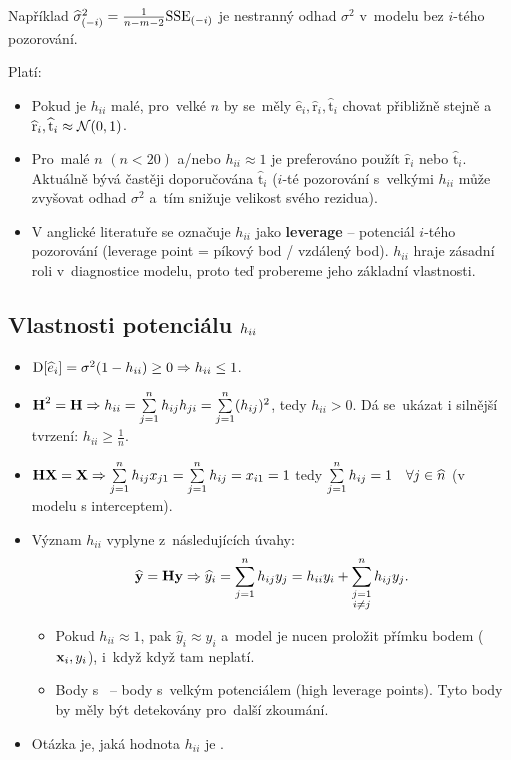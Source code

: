 Například $\widehat{\sigma}^2_{(-i)} = \frac{1}{n-m-2}\mathrm{SSE}_{(-i)}$ je nestranný odhad $\sigma^2$ v~modelu bez $i$-tého pozorování.

\begin{remark}
Platí:
\begin{itemize}
\item Pokud je $h_{ii}$ malé, pro~velké $n$ by se~měly $\widehat{\text{e}}_i, \widehat{\text{r}}_i, \widehat{\mathrm{t}}_i$ chovat přibližně stejně a~$\widehat{\text{r}}_i,\widehat{\mathrm{t}}_i \approx \mathcal{N} (0, 1)$.
\item Pro~malé $n$ $(n < 20)$ a/nebo $h_{ii} \approx 1$ je preferováno použít $\widehat{\text{r}}_i$ nebo $\widehat{\mathrm{t}}_i$. Aktuálně bývá častěji doporučována $\widehat{\mathrm{t}}_i$ ($i$-té pozorování s~velkými $h_{ii}$ může zvyšovat odhad $\sigma^2$ a~tím snižuje velikost svého rezidua).
\item V anglické literatuře se označuje $h_{ii}$ jako \textbf{leverage} -- potenciál $i$-tého pozorování (leverage point = píkový bod / vzdálený bod). $h_{ii}$ hraje zásadní roli v~diagnostice modelu, proto teď probereme jeho základní vlastnosti.
\end{itemize}
\end{remark}

\subsection{Vlastnosti potenciálu $h_{ii}$}

\begin{itemize}
\item $\mathrm{D} [\widehat{e}_i] = \sigma^2 (1 - h_{ii}) \geq 0 \Rightarrow h_{ii} \leq 1$.
\item $\textbf{H}^2 = \textbf{H} \Rightarrow h_{ii} = \sum\limits_{j=1}^{n} h_{ij} h_{ji} = \sum\limits_{j=1}^{n} (h_{ij})^2$, tedy $h_{ii} > 0$. Dá se~ukázat i silnější tvrzení: $h_{ii} \geq \frac{1}{n}$.
\item $\textbf{H}\mathbf{X} = \mathbf{X} \Rightarrow \sum\limits_{j=1}^{n} h_{ij} x_{j1} = \sum\limits_{j=1}^{n} h_{ij} = x_{i1} = 1$ tedy $\sum\limits_{j=1}^{n} h_{ij} = 1 \quad \forall j \in \widehat{n}$ (v modelu s interceptem).
\item Význam $h_{ii}$ vyplyne z~následujících úvahy:
 $$
 \widehat{\mathbf{y}} = \textbf{H} \mathbf{y} \Rightarrow \widehat{y}_i = \sum\limits_{j=1}^{n} h_{ij}y_j = h_{ii} y_i + \sum\limits_{\substack{j = 1 \\ i\neq j}}^n h_{ij} y_j.
 $$
 \begin{itemize}
 	\item Pokud $h_{ii} \approx 1$, pak $\widehat{y}_i \approx y_i$ a~model je nucen proložit přímku bodem ($\mathbf{x}_i, y_i$), i~když když tam neplatí.
 	\item Body s~ -- body s~velkým potenciálem (high leverage points). Tyto body by měly být detekovány pro~další zkoumání.
 \end{itemize}

 \item Otázka je, jaká hodnota $h_{ii}$ je .
\end{itemize}


